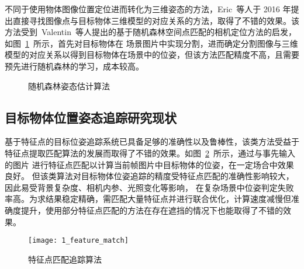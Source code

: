 不同于使用物体图像位置定位进而转化为三维姿态的方法，Eric~等人于 2016 年提出直接寻找图像点与目标物体三维模型的对应关系的方法\cite{BrachmannLearning6dObject2014,BrachmannUncertaintyDriven6DPose2016a}，取得了不错的效果。该方法受到~Valentin~等人\cite{ValentinExploitingUncertaintyRegression2015}提出的基于随机森林空间点匹配的相机定位方法的启发，如图~\ref{fig:uncertain_pose_estimation}~所示，首先对目标物体在
场景图片中实现分割，进而确定分割图像与三维模型的对应关系以得到目标物体在场景中的位姿，但该方法匹配精度不高，且需要预先进行随机森林的学习，成本较高。

\begin{figure}[t] %
  \centering%
  \caption{随机森林姿态估计算法}
  \label{fig:uncertain_pose_estimation}
\end{figure}


\subsection{目标物体位置姿态追踪研究现状}
\label{sec:tracking_status}
基于特征点的目标位姿追踪系统已具备足够的准确性以及鲁棒性，该类方法受益于特征点提取匹配算法的发展而取得了不错的效果\cite{VacchettiStableRealtime3d2004}。如图~\ref{fig:feature_match}~所示，通过与事先输入的图片
进行特征点匹配以计算当前帧图片中目标物体的位姿，在一定场合中效果良好。
但该类算法对目标物体位姿追踪的精度受特征点匹配的准确性影响较大，因此易受背景复杂度、相机内参、光照变化等影响，
在复杂场景中位姿判定失败率高。为求结果稳定精确，需匹配大量特征点并进行联合优化，计算速度减慢但准确度提升，使用部分特征点匹配的方法在存在遮挡的情况下也能取得了不错的效果\cite{ParkMultiple3dObject2008}。


\begin{figure}[t]
  \centering
\texttt{[image: 1\_feature\_match]}
  \caption{特征点匹配追踪算法}
  \label{fig:feature_match}
\end{figure}


